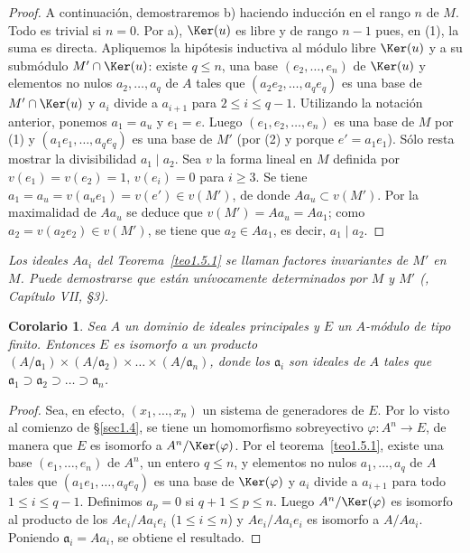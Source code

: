 \documentclass[oneside,bibtotoc,leqno,spanish]{amsbook}
\newcommand{\idl}[1]{\mathfrak{#1}}
\newcommand{\QED}{}%
\renewcommand{\to}[1][]{\xrightarrow{#1}}
\numberwithin{equation}{section}
\newenvironment{comm}%
	{\begin{trivlist}\item\small\itshape}
	{\end{trivlist}}
\theoremstyle{defi}
\theoremstyle{note}
\newtheorem{corollary}{Corolario}
\theoremstyle{rem}
\numberwithin{theorem}{section}
\numberwithin{proposition}{section}
\numberwithin{definition}{section}
\numberwithin{lemma}{section}
\numberwithin{corollary}{section}
\numberwithin{example}{section}
\numberwithin{footnote}{section}%
\begin{document}
\begin{proof}
A continuaci\'on, demostraremos b) haciendo inducci\'on en el rango $n$ de $M$. Todo es trivial
si $n = 0$. Por a), $\Ker(u)$ es libre y de rango $n-1$ pues, en (1), la suma es directa. Apliquemos
la hip\'otesis inductiva al m\'odulo libre $\Ker(u)$ y a su subm\'odulo $M'\cap\Ker(u)$:
existe $q\leq n$, una base $(e_{2},\dots,e_{n})$ de $\Ker(u)$ y elementos no nulos
$a_{2},\dots,a_{q}$ de $A$ tales que $(a_{2}e_{2},\dots,a_{q}e_{q})$ es una base de
$M'\cap\Ker(u)$ y $a_{i}$ divide a $a_{i+1}$ para $2\leq i\leq q-1$. Utilizando la notaci\'on
anterior, ponemos $a_{1} = a_{u}$ y $e_{1} = e$. Luego $(e_{1},e_{2},\dots,e_{n})$ es una base
de $M$ por (1) y $(a_{1}e_{1},\dots,a_{q}e_{q})$ es una base de $M'$ (por (2) y porque
$e' = a_{1}e_{1}$). S\'olo resta mostrar la divisibilidad $a_{1}\mid a_{2}$. Sea $v$ la
forma lineal en $M$ definida por $v(e_{1}) = v(e_{2}) = 1$, $v(e_{i}) = 0$ para $i\geq 3$.
Se tiene $a_{1} = a_{u} = v(a_{u}e_{1}) = v(e')\in v(M')$, de donde $Aa_{u}\subset v(M')$.
Por la maximalidad de $Aa_{u}$ se deduce que $v(M') = Aa_{u} = Aa_{1}$; como $a_{2} = v(a_{2}e_{2})
\in v(M')$, se tiene que $a_{2}\in Aa_{1}$, es decir, $a_{1}\mid a_{2}$. \QED
\end{proof}

\begin{comm}
Los ideales $Aa_{i}$ del Teorema~\ref{teo1.5.1} se llaman {\em factores
invariantes} de $M'$ en $M$. Puede demostrarse que est\'an un\'ivocamente determinados
por $M$ y $M'$ (\cite{Bourbaki1}, Cap\'itulo VII, \S3).
\end{comm}

\begin{corollary}\label{cor1.5.1}
Sea $A$ un dominio de ideales principales y $E$ un $A$-m\'odulo
de tipo finito. Entonces $E$ es isomorfo a un producto
$(A/\idl{a}_{1})\times(A/\idl{a}_{2})\times\dots\times
(A/\idl{a}_{n})$, donde los $\idl{a}_{i}$ son ideales de $A$
tales que $\idl{a}_{1}\supset\idl{a}_{2}\supset\dots\supset
\idl{a}_{n}$.
\end{corollary}

\begin{proof}
Sea, en efecto, $(x_{1},\dots,x_{n})$ un sistema de generadores de $E$. Por lo visto
al comienzo de \S\ref{sec1.4}, se tiene un homomorfismo sobreyectivo $\varphi:A^{n}\to E$, de manera
que $E$ es isomorfo a $A^{n}/\Ker(\varphi)$. Por el teorema~\ref{teo1.5.1},
existe una base $(e_{1},\dots,e_{n})$
de $A^{n}$, un entero $q\leq n$, y elementos no nulos $a_{1},\dots,a_{q}$ de $A$ tales que
$(a_{1}e_{1},\dots,a_{q}e_{q})$ es una base de $\Ker(\varphi)$ y $a_{i}$ divide a $a_{i+1}$ para
todo $1\leq i\leq q-1$. Definimos $a_{p} = 0$ si $q+1\leq p\leq n$. Luego $A^{n}/\Ker(\varphi)$
es isomorfo al producto de los $Ae_{i}/Aa_{i}e_{i}$ ($1\leq i\leq n$) y $Ae_{i}/Aa_{i}e_{i}$
es isomorfo a $A/Aa_{i}$. Poniendo $\idl{a}_{i} = Aa_{i}$, se obtiene el resultado. \QED
\end{proof}
\end{document}
